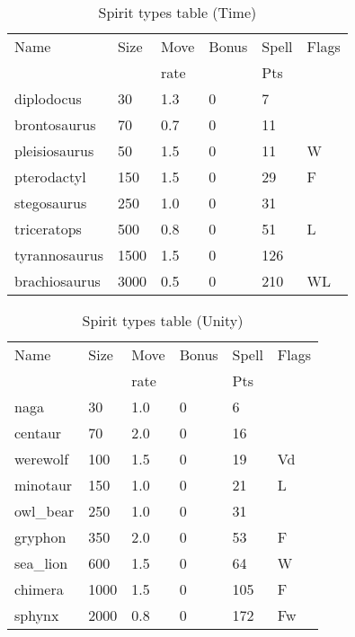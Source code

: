 \begin{same}
\begin{table}[hbpt]
\caption{Spirit types table (Time)}
\begin{tabular}{ || l | l | l | l | l | l || }
\hline
Name            & Size &Move&Bonus&Spell&Flags\\
                &      &rate&     &Pts  &\\
\hline
diplodocus      &   30 & 1.3&   0 &   7 &\\
brontosaurus    &   70 & 0.7&   0 &  11 &\\
pleisiosaurus   &   50 & 1.5&   0 &  11 &W\\
pterodactyl     &  150 & 1.5&   0 &  29 &F\\
stegosaurus     &  250 & 1.0&   0 &  31 &\\
triceratops     &  500 & 0.8&   0 &  51 &L\\
tyrannosaurus   & 1500 & 1.5&   0 &  126 &\\
brachiosaurus   & 3000 & 0.5&   0 &  210 &WL\\
\hline
\end{tabular}
\end{table}
\end{same}
\begin{same}
\begin{table}[hbpt]
\caption{Spirit types table (Unity)}
\begin{tabular}{ || l | l | l | l | l | l || }
\hline
Name            & Size &Move&Bonus&Spell&Flags\\
                &      &rate&     &Pts  &\\
\hline
naga            &   30 & 1.0&   0 &   6 &\\
centaur         &   70 & 2.0&   0 &  16 &\\
werewolf        &  100 & 1.5&   0 &  19 &Vd\\
minotaur        &  150 & 1.0&   0 &  21 &L\\
owl_bear        &  250 & 1.0&   0 &  31 &\\
gryphon         &  350 & 2.0&   0 &  53 &F\\
sea_lion        &  600 & 1.5&   0 &  64 &W\\
chimera         & 1000 & 1.5&   0 &  105 &F\\
sphynx          & 2000 & 0.8&   0 &  172 &Fw\\
\hline
\end{tabular}
\end{table}
\end{same}
